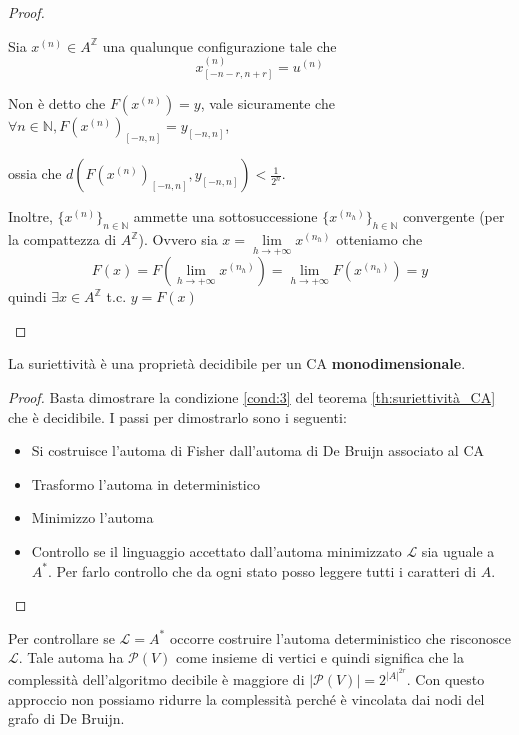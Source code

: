 \begin{teorema}
\begin{proof}
\begin{itemize}
                  Sia $x^{(n)}\in A^\mathbb{Z}$ una qualunque configurazione tale che
                  $$x^{(n)}_{[-n-r,n+r]} = u^{(n)}$$

                  Non è detto che $F(x^{(n)})=y$, vale sicuramente che $\forall n \in \mathbb{N},F(x^{(n)})_{[-n,n]}=y_{[-n,n]}$,

                  ossia che $d(F(x^{(n)})_{[-n,n]},y_{[-n,n]})< \frac{1}{2^n}$.

                  Inoltre, $\{x^{(n)}\}_{n\in \mathbb{N}}$ ammette una sottosuccessione
                  $\{x^{(n_h)}\}_{h\in \mathbb{N}}$ convergente (per la compattezza di $A^{\mathbb{Z}}$).
                  Ovvero sia $x= \lim\limits_{h\rightarrow +\infty}x ^{(n_h)}$ otteniamo  che $$ F(x)= F(\lim\limits_{h\rightarrow +\infty}x ^{(n_h)}) = \lim\limits_{h\rightarrow +\infty} F(x^{(n_h)})=y$$
                  quindi $\exists x \in A^\mathbb{Z}$ t.c. $y = F(x)$
        \end{itemize}
    \end{proof}
\end{teorema}

\begin{teorema}
    La suriettività è una proprietà decidibile per un CA \textbf{monodimensionale}.
    \begin{proof}
        Basta dimostrare la condizione \ref{cond:3} del teorema \ref{th:suriettività_CA}
        che è decidibile. I passi per dimostrarlo sono i seguenti:
        \begin{itemize}
            \item Si costruisce l'automa di Fisher dall'automa di De Bruijn associato al CA
            \item Trasformo l'automa in deterministico
            \item Minimizzo l'automa
            \item Controllo se il linguaggio accettato dall'automa minimizzato $\mathcal{L}$ sia
                  uguale a $A^\ast$. Per farlo controllo che da ogni stato posso leggere
                  tutti i caratteri di $A$.
        \end{itemize}
    \end{proof}
\end{teorema}
\begin{nota}
    Per controllare se $\mathcal{L} = A^\ast$ occorre costruire l'automa deterministico
    che risconosce $ \mathcal{L}$. Tale automa ha $\mathcal{P}(V)$ come insieme di
    vertici e quindi significa che la complessità dell'algoritmo decibile è maggiore
    di $|\mathcal{P}(V)| = 2^{|A|^{2r}}$. Con questo approccio non possiamo ridurre
    la complessità perché è vincolata dai nodi del grafo di De Bruijn.
\end{nota}


